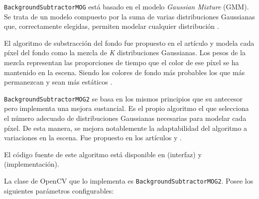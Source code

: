 \texttt{BackgroundSubtractorMOG} está basado en el modelo \emph{Gaussian
Mixture} (GMM). Se trata de un modelo compuesto por la suma de varias
distribuciones Gaussianas que, correctamente elegidas, permiten modelar
cualquier distribución \citep{coursera:gmm}.

El algoritmo de substracción del fondo fue propuesto en el artículo
\citep{art:yao_improved_2001} y modela cada píxel del fondo como la
mezcla de \emph{K} distribuciones Gaussianas. Los pesos de la mezcla
representan las proporciones de tiempo que el color de ese píxel se ha
mantenido en la escena. Siendo los colores de fondo más probables los
que más permanezcan y sean más estáticos \citep{opencv:bs_tutorial}.

\texttt{BackgroundSubtractorMOG2} se basa en los mismos principios que
su antecesor pero implementa una mejora sustancial. Es el propio
algoritmo el que selecciona el número adecuado de distribuciones
Gaussianas necesarias para modelar cada píxel. De esta manera, se mejora
notablemente la adaptabilidad del algoritmo a variaciones en la escena.
Fue propuesto en los artículos \citep{art:zivkovic_improved_2004} y
\citep{art:zivkovic_efficient_2006}.

El código fuente de este algoritmo está disponible en 
\citep{github:background_segm} (interfaz) y
\citep{github:bgfg_gaussmix2} (implementación).

La clase de OpenCV que lo implementa es
\texttt{BackgroundSubtractorMOG2}. Posee los siguientes parámetros
configurables: \citep{opencv:mog2}

